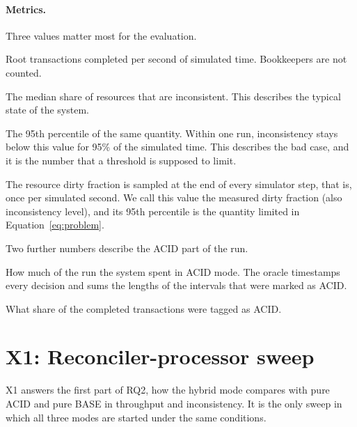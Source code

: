 \paragraph{Metrics.}\label{sec:exp-metrics} Three values matter most for the
evaluation.

\begin{bullets}
  \item[Throughput (\texttt{throughput\_tps}).] Root transactions completed per
  second of simulated time. Bookkeepers are not counted.

  \item[$p_{50}$ dirty fraction (\texttt{dirty\_p50\_pct}).] The median share of
  resources that are inconsistent. This describes the typical state of the
  system.

  \item[$p_{95}$ dirty fraction (\texttt{dirty\_p95\_pct}).] The 95th percentile
  of the same quantity. Within one run, inconsistency stays below this value for
  95\% of the simulated time. This describes the bad case, and it is the number
  that a threshold is supposed to limit.
\end{bullets}

The resource dirty fraction is sampled at the end of every simulator step, that
is, once per simulated second. We call this value the measured dirty fraction
(also inconsistency level), and its 95th percentile is the quantity limited in
Equation~\ref{eq:problem}.

\paperbreak
Two further numbers describe the ACID part of the run.

\begin{bullets}
  \item[ACID time share ($\phi_{\mathrm{time}}$).] How much of the run the
  system spent in ACID mode. The oracle timestamps every decision and sums the
  lengths of the intervals that were marked as ACID.

  \item[ACID completed share ($\phi_{\mathrm{comp}}$).] What share of the
  completed transactions were tagged as ACID.
\end{bullets}


\section{X1: Reconciler-processor sweep}\label{sec:x1-reconciler-sweep}

X1 answers the first part of RQ2, how the hybrid mode compares with pure ACID
and pure BASE in throughput and inconsistency. It is the only sweep in which all
three modes are started under the same conditions.


